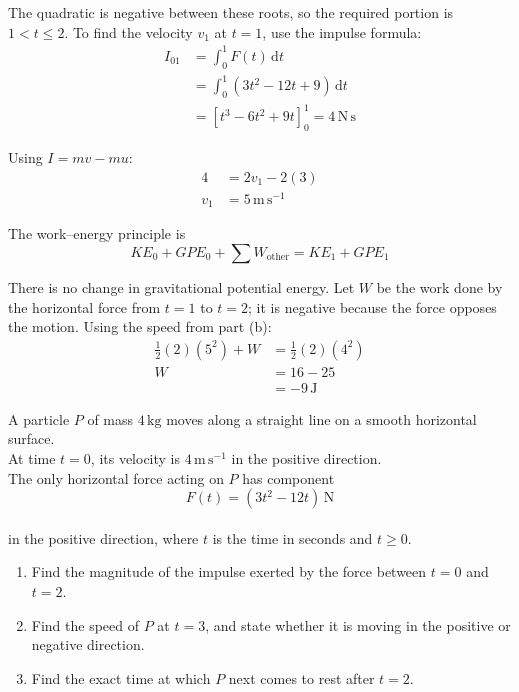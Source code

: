 \documentclass[leqno]{article}
\begin{document}
\begin{enumerate}[
  label=\textbf{\arabic*.},
  leftmargin=*,
  topsep=0pt,
  partopsep=0pt,
  parsep=0pt
]
\begin{djsSolution}
\begin{enumerate}[label=\textbf{(\alph*)}, start=1]
The quadratic is negative between these roots, so the required portion is \(1<t\leq2\). To find the velocity \(v_1\) at \(t=1\), use the impulse formula:
\begin{align*}
I_{01}&=\int_0^1 F(t)\,\mathrm{d}t\\
&=\int_0^1(3t^2-12t+9)\,\mathrm{d}t\\
&=\left[t^3-6t^2+9t\right]_0^1
=4\,\mathrm{N\,s}
\end{align*}

Using \(I=mv-mu\):
\begin{align*}
4&=2v_1-2(3)\\
v_1&=5\,\mathrm{m\,s^{-1}}
\end{align*}

The work--energy principle is
\[
KE_0+GPE_0+\sum W_{\text{other}}=KE_1+GPE_1
\]

There is no change in gravitational potential energy. Let \(W\) be the work done by the horizontal force from \(t=1\) to \(t=2\); it is negative because the force opposes the motion. Using the speed from part (b):
\begin{align*}
\frac12(2)(5^2)+W&=\frac12(2)(4^2)\\
W&=16-25\\
&=-9\,\mathrm{J}
\end{align*}

\end{enumerate}
\end{djsSolution}

\newpage

\questionitem

A particle $P$ of mass $4\,\mathrm{kg}$ moves along a straight line on a smooth horizontal surface. \\
At time $t=0$, its velocity is $4\,\mathrm{m\,s^{-1}}$ in the positive direction. \\
The only horizontal force acting on $P$ has component
\[
F(t)=(3t^2-12t)\,\mathrm{N}
\] \\
in the positive direction, where $t$ is the time in seconds and $t\geq 0$. \\
\begin{enumerate}[label=\textbf{(\alph*)}]
\item Find the magnitude of the impulse exerted by the force between $t=0$ and $t=2$.  \\
\item Find the speed of $P$ at $t=3$, and state whether it is moving in the positive or negative direction.  \\
\item Find the exact time at which $P$ next comes to rest after $t=2$.  \\
\end{enumerate}


\end{enumerate}
\end{document}
